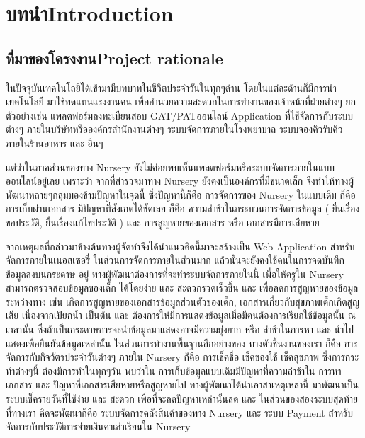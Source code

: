 \chapter{\ifcpe บทนำ\else Introduction\fi}

\section{\ifcpe ที่มาของโครงงาน\else Project rationale\fi}

ในปัจจุบันเทคโนโลยีได้เข้ามามีบทบาทในชีวิตประจําวันในทุกๆด้าน โดยในแต่ละด้านก็มีการนําเทคโนโลยี มาใช้ทดแทนแรงงานคน  เพื่ออํานวยความสะดวกในการทํางานของเจ้าหน้าที่ฝ่ายต่างๆ  ยกตัวอย่างเช่น แพลตฟอร์มลงทะเบียนสอบ GAT/PATออนไลน์ Application ที่ใช้จัดการกับระบบต่างๆ ภายในบริษัทหรือองค์กรสำนักงานต่างๆ ระบบจัดการภายในโรงพยาบาล ระบบจองคิวรับคิวภายในร้านอาหาร และ อื่นๆ

แต่ว่าในภาคส่วนของทาง Nursery ยังไม่ค่อยพบเห็นแพลตฟอร์มหรือระบบจัดการภายในแบบออนไลน์อยู่เลย
เพราะว่า จากที่สำรวจมาทาง Nursery ยังคงเป็นองค์กรที่มีขนาดเล็ก จึงทำให้ทางผู้พัฒนาหลายๆกลุ่มมองข้ามปัญหาในจุดนี้  ซึ่งปัญหานี้ก็คือ การจัดการของ Nursery ในแบบเดิม ก็คือ การเก็บผ่านเอกสาร  มีปัญหาที่สังเกตได้ชัดเลย ก็คือ ความล่าช้าในกระบวนการจัดการข้อมูล ( ยื่นเรื่องขอประวัติ, ยื่นเรื่องแก้ไขประวัติ ) และ การสูญหายของเอกสาร หรือ เอกสารมีการเสียหาย  

จากเหตุผลที่กล่าวมาข้างต้นทางผู้จัดทําจึงได้นำแนวคิดนี้มาจะสร้างเป็น Web-Application 
สําหรับจัดการภายในเนอสเซอรี่ ในส่วนการจัดการภายในส่วนมาก แล้วนั้นจะยังคงใช้คนในการจดบันทึกข้อมูลลงบนกระดาษ
อยู่ ทางผู้พัฒนาต้องการที่จะทําระบบจัดการภายในนี้ เพื่อให้ครูใน Nursery สามารถตรวจสอบข้อมูลของเด็ก ได้โดยง่าย และ สะดวกรวดเร็วขึ้น และ  เพื่อลดการสูญหายของข้อมูลระหว่างทาง เช่น เกิดการสูญหายของเอกสารข้อมูลส่วนตัวของเด็ก, เอกสารเกี่ยวกับสุขภาพเด็กเกิดสูญเสีย เนื่องจากเปียกน้ำ เป็นต้น และ ต้องการให้มีการแสดงข้อมูลเมื่อมีคนต้องการเรียกใช้ข้อมูลนั้น ณ เวลานั้น   ซึ่งถ้าเป็นกระดาษการจะนําข้อมูลมาแสดงอาจมีความยุ่งยาก หรือ ล่าช้าในการหา และ นําไปแสดงเพื่อยืนยันข้อมูลเหล่านั้น ในส่วนการทำงานพื้นฐานอีกอย่างของ ทางตัวชิ้นงานของเรา 
ก็คือ การจัดการกับกิจวัตรประจำวันต่างๆ ภายใน Nursery ก็คือ การเช็คชื่อ เช็คของใช้ เช็คสุขภาพ
ซึ่งการกระทำต่างๆนี้ ต้องมีการทำในทุกๆวัน พบว่าใน การเก็บข้อมูลแบบเดิมมีปัญหาที่ความล่าช้าใน การหาเอกสาร และ ปัญหาที่เอกสารเสียหายหรือสูญหายไป ทางผู้พัฒนาได้นำเอาสาเหตุเหล่านี้ มาพัฒนาเป็น ระบบเช็ครายวันที่ใช้ง่าย และ สะดวก เพื่อที่จะลดปัญหาเหล่านั้นลด และ ในส่วนของสองระบบสุดท้ายที่ทางเรา คิดจะพัฒนาก็คือ ระบบจัดการคลังสินค้าของทาง Nursery และ ระบบ Payment สำหรับจัดการกับประวัติการจ่ายเงินค่าเล่าเรียนใน Nursery



